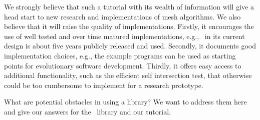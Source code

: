 We strongly believe that such a tutorial with its wealth of
information will give a head start to new research and implementations
of mesh algorithms. We also believe that it will raise the quality of
implementations. Firstly, it encourages the use of well tested and
over time matured implementations, e.g., \cgalpoly\ in its current
design is about five years publicly released and used. Secondly, it
documents good implementation choices, e.g., the example programs can
be used as starting points for evolutionary software development.
Thirdly, it offers easy access to additional functionality, such as
the efficient self intersection test, that otherwise could be too
cumbersome to implement for a research prototype.

What are potential obstacles in using a library? We want to address
them here and give our answers for the \cgal\ library and our
tutorial. 


